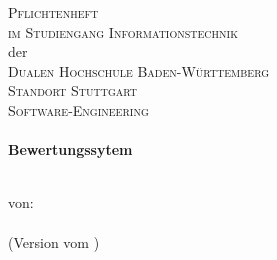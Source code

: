 
\begin{titlepage}
	
	\begin{center}
		
		\textsc{\LARGE Pflichtenheft}\\[2cm]
		\textsc{\large im Studiengang Informationstechnik}\\
		der\\
		\textsc{\large Dualen Hochschule Baden-Württemberg}\\
		\textsc{\large Standort Stuttgart}\\
		\textsc{\large Software-Engineering}\\[3.2cm]
		

		\HRule \\[0.4cm]
		{\huge \bfseries Bewertungssytem}\\[0.4cm]
		\HRule \\[0.1cm]
		\author{\vhListAllAuthors}
		\large von:\\ \textsc{\sLong}\\[0.2cm]
		(Version \vhCurrentVersion\hspace{0.1cm} vom \vhCurrentDate)
		\vspace{10.0cm}
			
	\end{center}

\end{titlepage}